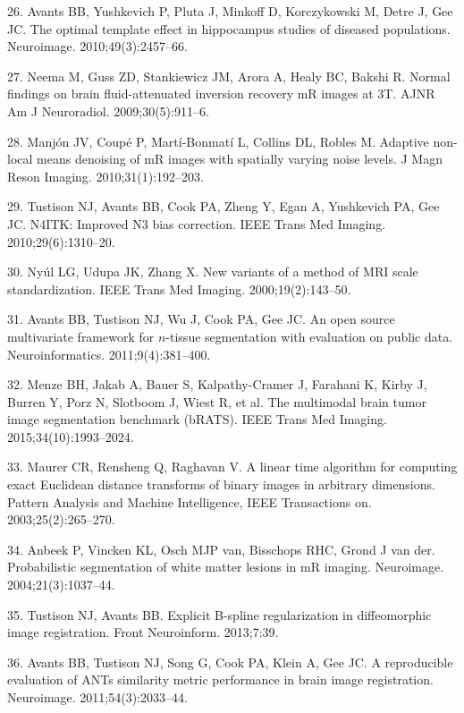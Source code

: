 \documentclass[11pt,]{article}
\begin{document}
\hypertarget{ref-Avants:2010aa}{}
26. Avants BB, Yushkevich P, Pluta J, Minkoff D, Korczykowski M, Detre
J, Gee JC. The optimal template effect in hippocampus studies of
diseased populations. Neuroimage. 2010;49(3):2457--66.

\hypertarget{ref-Neema:2009aa}{}
27. Neema M, Guss ZD, Stankiewicz JM, Arora A, Healy BC, Bakshi R.
Normal findings on brain fluid-attenuated inversion recovery mR images
at 3T. AJNR Am J Neuroradiol. 2009;30(5):911--6.

\hypertarget{ref-Manjon:2010aa}{}
28. Manjón JV, Coupé P, Martí-Bonmatí L, Collins DL, Robles M. Adaptive
non-local means denoising of mR images with spatially varying noise
levels. J Magn Reson Imaging. 2010;31(1):192--203.

\hypertarget{ref-Tustison:2010ac}{}
29. Tustison NJ, Avants BB, Cook PA, Zheng Y, Egan A, Yushkevich PA, Gee
JC. N4ITK: Improved N3 bias correction. IEEE Trans Med Imaging.
2010;29(6):1310--20.

\hypertarget{ref-nyul2000}{}
30. Nyúl LG, Udupa JK, Zhang X. New variants of a method of MRI scale
standardization. IEEE Trans Med Imaging. 2000;19(2):143--50.

\hypertarget{ref-Avants:2011aa}{}
31. Avants BB, Tustison NJ, Wu J, Cook PA, Gee JC. An open source
multivariate framework for \(n\)-tissue segmentation with evaluation on
public data. Neuroinformatics. 2011;9(4):381--400.

\hypertarget{ref-Menze:2015aa}{}
32. Menze BH, Jakab A, Bauer S, Kalpathy-Cramer J, Farahani K, Kirby J,
Burren Y, Porz N, Slotboom J, Wiest R, et al. The multimodal brain tumor
image segmentation benchmark (bRATS). IEEE Trans Med Imaging.
2015;34(10):1993--2024.

\hypertarget{ref-maurer2003}{}
33. Maurer CR, Rensheng Q, Raghavan V. A linear time algorithm for
computing exact Euclidean distance transforms of binary images in
arbitrary dimensions. Pattern Analysis and Machine Intelligence, IEEE
Transactions on. 2003;25(2):265--270.

\hypertarget{ref-Anbeek:2004aa}{}
34. Anbeek P, Vincken KL, Osch MJP van, Bisschops RHC, Grond J van der.
Probabilistic segmentation of white matter lesions in mR imaging.
Neuroimage. 2004;21(3):1037--44.

\hypertarget{ref-Tustison:2013ac}{}
35. Tustison NJ, Avants BB. Explicit B-spline regularization in
diffeomorphic image registration. Front Neuroinform. 2013;7:39.

\hypertarget{ref-Avants:2011ab}{}
36. Avants BB, Tustison NJ, Song G, Cook PA, Klein A, Gee JC. A
reproducible evaluation of ANTs similarity metric performance in brain
image registration. Neuroimage. 2011;54(3):2033--44.
\end{document}
